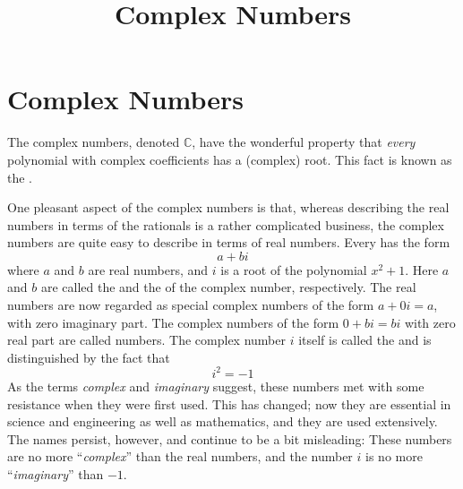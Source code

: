 \documentclass{ximera}
\title{Complex Numbers} \license{CC BY-SA-NC 4.0}
\begin{document}
\begin{abstract}
\end{abstract}
\maketitle

\section*{Complex Numbers}

The complex numbers, denoted $\mathbb{C}$, have the wonderful property that \textit{every} polynomial with complex coefficients has a (complex) root. This fact is known as the .

One pleasant aspect of the complex
numbers is that, whereas describing the real numbers in terms of the
rationals is a rather complicated business, the complex numbers are
quite easy to describe in terms of real numbers. Every  has the form
\begin{equation*}
a + bi
\end{equation*}
where $a$ and $b$ are real numbers, and $i$ is a root of the polynomial $x^{2} + 1$. Here $a$ and $b$ are called the  and the  of the complex number, respectively. The real numbers are now regarded as special complex numbers of the form $a + 0i = a$, with zero imaginary part. The complex numbers of the form $0 + bi = bi$ with zero real part are called  numbers. The complex number $i$ itself is called the  and is distinguished by the fact that
\begin{equation*}
i^2 = -1
\end{equation*}
As the terms \textit{complex} and \textit{imaginary}
 suggest, these numbers met with some resistance when they were first
used. This has changed; now they are essential in science and
engineering as well as mathematics, and they are used extensively. The
names persist, however, and continue to be a bit misleading: These
numbers are no more ``\textit{complex}'' than the real numbers, and the number $i$ is no more ``\textit{imaginary}'' than $-1$.
\end{document}
